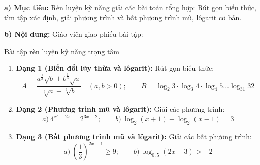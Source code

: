 \documentclass[12pt, a4paper]{article}
\begin{document}
\noindent \textbf{a) Mục tiêu:}
Rèn luyện kỹ năng giải các bài toán tổng hợp: Rút gọn biểu thức, tìm tập xác định, giải phương trình và bất phương trình mũ, lôgarit cơ bản.

\noindent \textbf{b) Nội dung:}
Giáo viên giao phiếu bài tập:
\begin{pedabox}{Bài tập rèn luyện kỹ năng trọng tâm}
\begin{enumerate}[leftmargin=0.6cm]
    \item \textbf{Dạng 1 (Biến đổi lũy thừa và lôgarit):} Rút gọn biểu thức:
    $$A = \dfrac{a^{\frac{1}{3}} \sqrt{b} + b^{\frac{1}{3}} \sqrt{a}}{\sqrt[6]{a} + \sqrt[6]{b}} \quad (a, b > 0); \qquad B = \log_2 3 \cdot \log_3 4 \cdot \log_4 5 \dots \log_{31} 32$$
    \item \textbf{Dạng 2 (Phương trình mũ và lôgarit):} Giải các phương trình:
    $$a) \ 4^{x^2 - 2x} = 2^{3x - 2}; \qquad b) \ \log_2 (x + 1) + \log_2 (x - 1) = 3$$
    \item \textbf{Dạng 3 (Bất phương trình mũ và lôgarit):} Giải các bất phương trình:
    $$a) \ \left(\dfrac{1}{3}\right)^{2x - 1} \ge 9; \qquad b) \ \log_{0{,}5} (2x - 3) > -2$$
\end{enumerate}
\end{pedabox}
\end{document}

